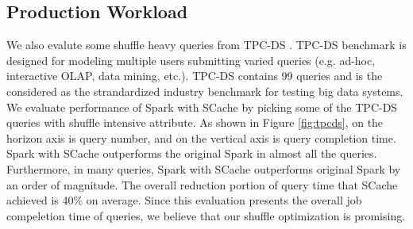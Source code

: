 \subsection{Production Workload}
We also evalute some shuffle heavy queries from TPC-DS \cite{tpcds}. TPC-DS benchmark is designed for modeling multiple users submitting varied queries (e.g. ad-hoc, interactive OLAP, data mining, etc.). TPC-DS contains 99 queries and is the considered as the  strandardized industry benchmark for testing big data systems. We evaluate performance of Spark with SCache by picking some of the TPC-DS queries with shuffle intensive attribute. As shown in Figure \ref{fig:tpcds}, on the horizon axis is query number, and on the vertical axis is query completion time. Spark with SCache outperforms the original Spark in almost all the queries. Furthermore, in many queries, Spark with SCache outperforms original Spark by an order of magnitude. The overall reduction portion of query time that SCache achieved is 40\% on average. Since this evaluation presents the overall job compeletion time of queries, we believe that our shuffle optimization is promising.

